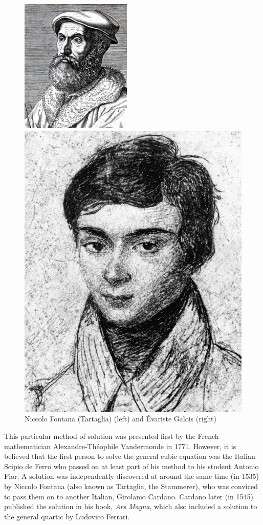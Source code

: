 \documentclass[a4paper,10pt,titlepage]{article}
\theoremstyle{definition}
\begin{document}
\begin{figure}
  \centering
  \begin{minipage}{0.5\textwidth}
  \begin{center}
    \includegraphics[width=0.4\linewidth]{tartaglia}
  \end{center}
  \end{minipage}%
  \begin{minipage}{0.5\textwidth}
  \begin{center}
    \includegraphics[width=0.4\linewidth]{galois}
  \end{center}
  \end{minipage}
  \caption{Niccolo Fontana (Tartaglia) (left) and \'Evariste Galois (right)}
\end{figure}

This particular method of solution was presented first by the French mathematician Alexandre-Th\'eophile Vandermonde
in 1771. However, it is believed that the first person to solve the general cubic equation was the Italian
Scipio de Ferro who passed on at least part of his method to his student Antonio Fior. A solution
was independently discovered at around the same time (in 1535) by Niccolo Fontana (also known as Tartaglia,
the Stammerer), who was conviced to pass them on to another Italian, Girolamo Cardano. Cardano later (in 1545)
published the solution in his book, \emph{Ars Magna}, which also included a solution to the general quartic
by Ludovico Ferrari.
\end{document}
